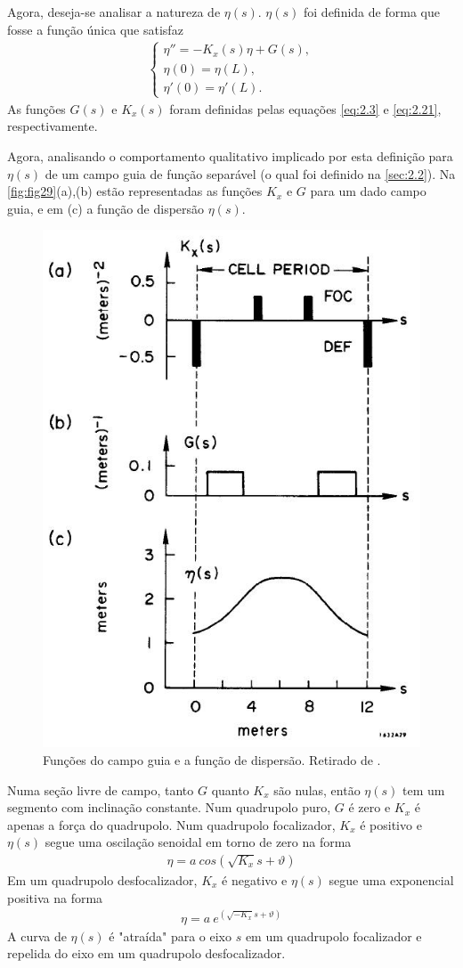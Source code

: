 Agora, deseja-se analisar a natureza de $\eta(s)$. $\eta(s)$ foi definida de forma que fosse a função única que satisfaz	
\begin{align}
	\begin{cases}
		\eta'' = -K_x(s)\eta + G(s), \\
        \eta(0) = \eta(L), \\
        \eta'(0) = \eta'(L).\label{eq:3.4}
    \end{cases}
\end{align}
As funções $G(s)$ e $K_x(s)$ foram definidas pelas equações \eqref{eq:2.3} e \eqref{eq:2.21}, respectivamente.

Agora, analisando o comportamento qualitativo implicado por esta definição para $\eta(s)$ de um campo guia de função separável (o qual foi definido na \autoref{sec:2.2}). Na \autoref{fig:fig29}(a),(b) estão representadas as funções $K_x$ e $G$ para um dado campo guia, e em (c) a função de dispersão $\eta(s)$.

\begin{figure}[!htb]
	\centering
	\includegraphics[width=0.6\linewidth]{./Figuras/fig29.jpeg}
	\caption{Funções do campo guia e a função de dispersão. Retirado de \cite{sands1970physics}.}
	\label{fig:fig29}
\end{figure}

Numa seção livre de campo, tanto $G$ quanto $K_x$ são nulas, então $\eta(s)$ tem um segmento com inclinação constante. Num quadrupolo puro, $G$ é zero e $K_x$ é apenas a força do quadrupolo. Num quadrupolo focalizador, $K_x$ é positivo e $\eta(s)$ segue uma oscilação senoidal em torno de zero na forma
\begin{align}
	\eta = a\ cos\left(\sqrt{K_x}s + \vartheta\right)
\end{align}
Em um quadrupolo desfocalizador, $K_x$ é negativo e $\eta(s)$ segue uma exponencial positiva na forma
\begin{align}
	\eta = a\ e^{(\sqrt{-K_x}s + \vartheta)}
\end{align}
A curva de $\eta(s)$ é "atraída" para o eixo $s$ em um quadrupolo focalizador e repelida do eixo em um quadrupolo desfocalizador.

